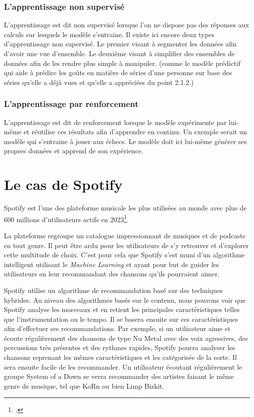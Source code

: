 \documentclass[12pt,a4paper]{article}
\begin{document}
\subsubsection{L'apprentissage non supervisé}

L'apprentissage est dit non supervisé lorsque l'on ne dispose pas des réponses aux calculs sur lesquels le modèle s'entraine. Il existe ici encore deux types d'apprentissage non supervisé. Le premier visant à segmenter les données afin d'avoir une vue d'ensemble. Le deuxième visant à simplifier des ensembles de données afin de les rendre plus simple à manipuler. 
(comme le modèle prédictif qui aide à prédire les goûts en matière de séries d'une personne sur base des séries qu'elle a déjà vues et qu'elle a appréciées du point 2.1.2.)
	
\subsubsection{L'apprentissage par renforcement}
	
L'apprentissage est dit de renforcement lorsque le modèle expérimente par lui-même et réutilise ces résultats afin d'apprendre en continu. Un exemple serait un modèle qui s'entraine à jouer aux échecs. Le modèle doit ici lui-même générer ses propres données et apprend de son expérience. 

\section{Le cas de Spotify}
Spotify est l'une des plateforme musicale les plus utilisées au monde avec plus de 600 millions d'utilisateurs actifs en 2023\footcite{statista2024spotify}.

La plateforme regroupe un catalogue impressionnant de musiques et de podcasts en tout genre. Il peut être ardu pour les utilisateurs de s'y retrouver et d'explorer cette multitude de choix. C'est pour cela que Spotify s'est muni d'un algorithme intelligent utilisant le \textit{Machine Learning} et ayant pour but de guider les utilisateurs en leur recommandant des chansons qu'ils pourraient aimer. 

Spotify utilise un algorithme de recommandation basé sur des techniques hybrides. Au niveau des algorithmes basés sur le contenu, nous pouvons voir que Spotify analyse les morceaux et en retient les principales caractéristiques telles que l'instrumentation ou le tempo. Il se basera ensuite sur ces caractéristiques afin d'effectuer ses recommandations. Par exemple, si un utilisateur aime et écoute régulièrement des chansons de type Nu Metal avec des voix agressives, des percussions très présentes et des rythmes rapides, Spotify pourra analyser les chansons reprenant les mêmes caractéristiques et les catégorisée de la sorte. Il sera ensuite facile de les recommander. Un utilisateur écoutant régulièrement le groupe System of a Down se verra recommander des artistes faisant le même genre de musique, tel que KoRn ou bien Limp Bizkit. 
\end{document}
